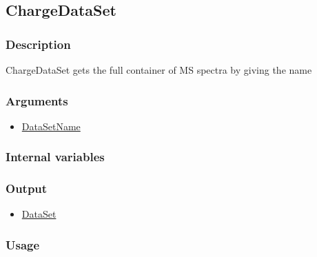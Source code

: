 \subsection{ChargeDataSet}\label{ChargeDataSet}
\subsubsection{Description}
ChargeDataSet gets the full container of MS spectra by giving the name
\subsubsection{Arguments}
\begin{itemize}
\item \hyperref[DataSetName]{DataSetName}
\end{itemize}
\subsubsection{Internal variables}
\subsubsection{Output}
\begin{itemize}
\item \hyperref[DataSet]{DataSet} %
\end{itemize}
\subsubsection{Usage}


